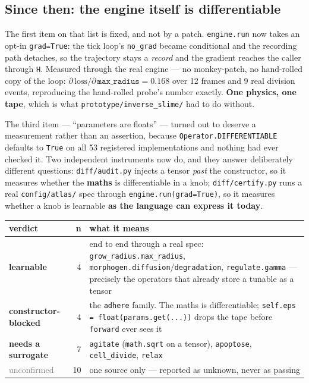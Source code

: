 \documentclass[11pt,a4paper]{article}
\newcommand{\code}[1]{\texttt{#1}}
\begin{document}
\subsection{Since then: the engine itself is differentiable}\label{sec:p6now}

The first item on that list is fixed, and not by a patch. \code{engine.run} now takes an opt-in
\code{grad=True}: the tick loop's \code{no\_grad} became conditional and the recording path
detaches, so the trajectory stays a \emph{record} and the gradient reaches the caller through
\code{H}. Measured through the real engine --- no monkey-patch, no hand-rolled copy of the loop:
$\partial\,\mathrm{loss}/\partial\,\code{max\_radius} = 0.168$ over 12 frames and 9 real division
events, reproducing the hand-rolled probe's number exactly. \textbf{One physics, one tape}, which
is what \code{prototype/inverse\_slime/} had to do without.

The third item --- ``parameters are floats'' --- turned out to deserve a measurement rather than an
assertion, because \code{Operator.DIFFERENTIABLE} defaults to \code{True} on all 53 registered
implementations and nothing had ever checked it. Two independent instruments now do, and they
answer deliberately different questions: \code{diff/audit.py} injects a tensor \emph{past} the
constructor, so it measures whether the \textbf{maths} is differentiable in a knob;
\code{diff/certify.py} runs a real \code{config/atlas/} spec through \code{engine.run(grad=True)},
so it measures whether a knob is learnable \textbf{as the language can express it today}.

\begin{center}
\small
\begin{tabular}{@{}l r p{9.1cm}@{}}
\toprule
\textbf{verdict} & \textbf{n} & \textbf{what it means}\\
\midrule
\textcolor{good}{\textbf{learnable}} & 4 &
end to end through a real spec: \code{grow\_radius.max\_radius},
\code{morphogen.diffusion}/\code{degradation}, \code{regulate.gamma} --- precisely the operators
that already store a tunable as a tensor\\
\textcolor{warn}{\textbf{constructor-blocked}} & 4 &
the \code{adhere} family. The maths is differentiable; \code{self.eps = float(params.get(...))}
drops the tape before \code{forward} ever sees it\\
\textcolor{bad}{\textbf{needs a surrogate}} & 7 &
\code{agitate} (\code{math.sqrt} on a tensor), \code{apoptose}, \code{cell\_divide},
\code{relax}\\
\textcolor{grey}{unconfirmed} & 10 &
one source only --- reported as unknown, never as passing\\
\bottomrule
\end{tabular}
\end{center}
\end{document}
